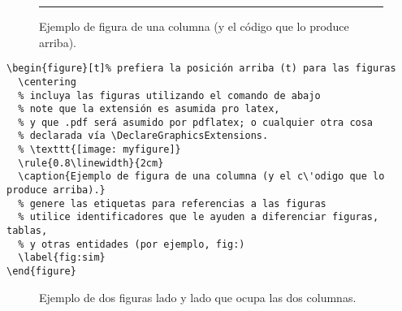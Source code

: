 \documentclass[twocolumn,11pts]{IEEEtran}
\begin{document}
\begin{figure}[t]%
  \centering
  \rule{0.8\linewidth}{2cm}
  \caption{Ejemplo de figura de una columna (y el c\'odigo que lo produce arriba).}
  \label{fig:sim}
\end{figure}

\begin{lstlisting}[float=tb,caption={Código que produce la Figura~\ref{fig:sim}.},label=cod:sim]
\begin{figure}[t]% prefiera la posición arriba (t) para las figuras
  \centering
  % incluya las figuras utilizando el comando de abajo
  % note que la extensión es asumida pro latex,
  % y que .pdf será asumido por pdflatex; o cualquier otra cosa
  % declarada vía \DeclareGraphicsExtensions.
  % \texttt{[image: myfigure]}
  \rule{0.8\linewidth}{2cm}
  \caption{Ejemplo de figura de una columna (y el c\'odigo que lo produce arriba).}
  % genere las etiquetas para referencias a las figuras
  % utilice identificadores que le ayuden a diferenciar figuras, tablas,
  % y otras entidades (por ejemplo, fig:)
  \label{fig:sim}
\end{figure}
\end{lstlisting}


%
\begin{figure*}[bt]%
\centering
\subfloat[Case I]{%
  \rule{5cm}{5cm}
  \label{fig:first_case}
}%
\subfloat[Case II]{%
  \rule{5cm}{6cm}
  \label{fig:second_case}
}
\caption{Ejemplo de dos figuras lado y lado que ocupa las dos columnas.}
\label{fig:twocol}
\end{figure*}
\end{document}
